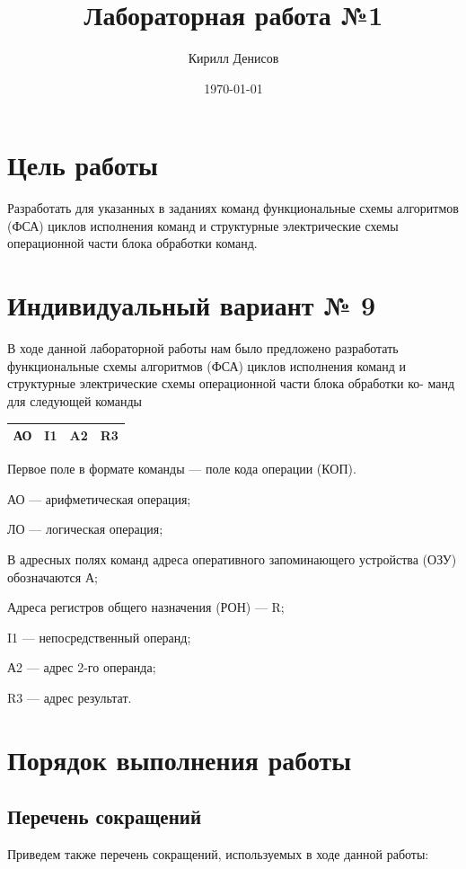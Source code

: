 \documentclass[a4paper,14pt]{extarticle}
\author{Кирилл Денисов}
\title{Лабораторная работа №1}
\date{\today}
\newcommand{\pathToCommonFolder}{/home/denilai/Documents/repos/latex/Common}
\begin{document}
	\thispagestyle{empty}
	
	\newpage
	\newpage
	
\section{Цель работы}
Разработать для указанных в заданиях команд функциональные схемы
алгоритмов (ФСА) циклов исполнения команд и структурные электрические
схемы операционной части блока обработки команд.
\section {Индивидуальный вариант № 9}
В ходе данной лабораторной работы нам было предложено разработать
функциональные схемы алгоритмов (ФСА) циклов исполнения команд и
структурные электрические схемы операционной части блока обработки ко-
манд для следующей команды

\begin{center}
	\begin{tabular}{|c|c|c|c|}
	\hline
	АО & I1 &A2 &R3  \\
	\hline
\end{tabular}
\end{center}

Первое поле в формате команды — поле кода операции (КОП).

АО — арифметическая операция;

ЛО — логическая операция;

В адресных полях команд адреса оперативного запоминающего устройства (ОЗУ) обозначаются А;

Адреса регистров общего назначения (РОН) — R;

I1 — непосредственный операнд;

А2 — адрес 2-го операнда;

R3 — адрес результат.



\section{Порядок выполнения работы}


\subsection{Перечень сокращений}
Приведем также перечень сокращений, используемых в ходе данной работы:
\end{document}
